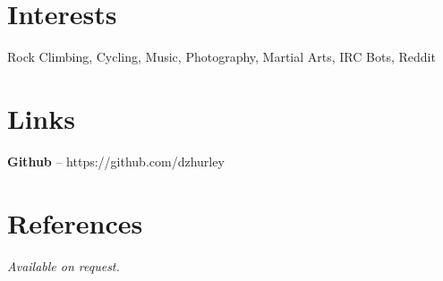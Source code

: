 \documentclass[margin,line]{resume}
\begin{document}
\begin{resume}
    \section{\mysidestyle Interests}

    Rock Climbing, Cycling, Music, Photography, Martial Arts, IRC Bots, Reddit

    \section{\mysidestyle Links}

    \textbf{Github} -- https://github.com/dzhurley

    \section{\mysidestyle References}
    {\sl Available on request.}



\end{resume}
\end{document}

